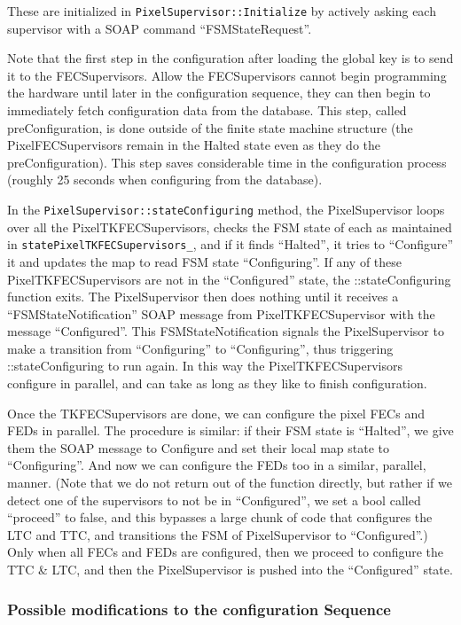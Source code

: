 These are initialized in {\tt PixelSupervisor::Initialize} by actively
asking each supervisor with a SOAP command ``FSMStateRequest''.

Note that the first step in the configuration after loading the global key is to send it to the FECSupervisors.
Allow the FECSupervisors cannot begin programming the hardware until later in the configuration sequence, they can
then begin to immediately fetch configuration data from the database. This step, called preConfiguration, is done
outside of the finite state machine structure (the PixelFECSupervisors remain in the Halted state even as they do the
preConfiguration). This step saves considerable time in the configuration process (roughly 25 seconds when configuring
from the database).

In the {\tt PixelSupervisor::stateConfiguring} method, 
the PixelSupervisor loops over all
the PixelTKFECSupervisors, checks the FSM state of each as maintained in
{\tt statePixelTKFECSupervisors\_}, and if it finds ``Halted'', it tries to
``Configure'' it and updates the map to read FSM state ``Configuring''. 
If any of these PixelTKFECSupervisors are not in the ``Configured'' state,
the ::stateConfiguring function exits. The PixelSupervisor then does nothing until it receives a 
``FSMStateNotification'' SOAP message from PixelTKFECSupervisor with the message ``Configured''.
This FSMStateNotification signals the
PixelSupervisor to make a transition from ``Configuring'' to ``Configuring'',
thus triggering ::stateConfiguring to run again.
In this way the PixelTKFECSupervisors configure in parallel, and can take as long as they like to finish configuration.

Once the TKFECSupervisors are done, we can configure the pixel FECs and FEDs in
parallel. The procedure is similar: if their FSM state is ``Halted'', we give them
the SOAP message to Configure and set their local map state to
``Configuring''. And now we can configure the FEDs too in a similar,
parallel, manner. (Note that we do not return out of the function directly, but rather if we
detect one of the supervisors to not be in ``Configured'', we
set a bool called ``proceed'' to false, and this bypasses a large chunk
of code that configures the LTC and TTC, and transitions the FSM of
PixelSupervisor to ``Configured''.) Only when all
FECs and FEDs are configured, then we proceed to configure the TTC \& LTC, and then
the PixelSupervisor is pushed into the ``Configured'' state.

\subsubsection{Possible modifications to the configuration Sequence}

